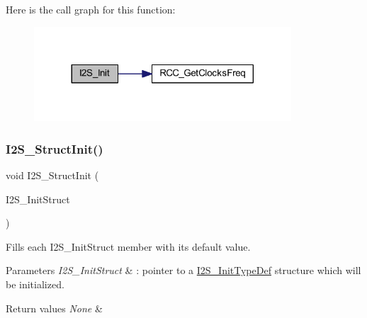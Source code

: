 Here is the call graph for this function\+:
\nopagebreak
\begin{figure}[H]
\begin{center}
\leavevmode
\includegraphics[width=272pt]{group___s_p_i___exported___functions_ga53661884ae4a9640df7cbc59187782f7_cgraph}
\end{center}
\end{figure}
\mbox{\label{group___s_p_i___exported___functions_ga7470ec1d0759fdeeb42c7fe71a3b41b7}} 
\subsubsection{\texorpdfstring{I2\+S\+\_\+\+Struct\+Init()}{I2S\_StructInit()}}
{\footnotesize\ttfamily void I2\+S\+\_\+\+Struct\+Init (\begin{DoxyParamCaption}\item[{\hyperlink{struct_i2_s___init_type_def}{I2\+S\+\_\+\+Init\+Type\+Def} $\ast$}]{I2\+S\+\_\+\+Init\+Struct }\end{DoxyParamCaption})}



Fills each I2\+S\+\_\+\+Init\+Struct member with its default value. 


\begin{DoxyParams}{Parameters}
{\em I2\+S\+\_\+\+Init\+Struct} & \+: pointer to a \hyperlink{struct_i2_s___init_type_def}{I2\+S\+\_\+\+Init\+Type\+Def} structure which will be initialized. \\
\hline
\end{DoxyParams}

\begin{DoxyRetVals}{Return values}
{\em None} & \\
\hline
\end{DoxyRetVals}


